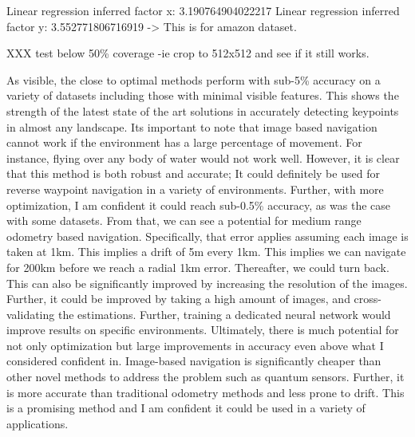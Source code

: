 Linear regression inferred factor x: 3.190764904022217
Linear regression inferred factor y: 3.552771806716919 -> This is for amazon dataset.


XXX test below 50\% coverage -ie crop to 512x512 and see if it still works.


As visible, the close to optimal methods perform with sub-5\% accuracy on a variety of datasets including those with minimal visible features. This shows the strength of the latest state of the art solutions in accurately detecting keypoints in almost any landscape. Its important to note that image based navigation cannot work if the environment has a large percentage of movement. For instance, flying over any body of water would not work well. However, it is clear that this method is both robust and accurate; It could definitely be used for reverse waypoint navigation in a variety of environments. Further, with more optimization, I am confident it could reach sub-0.5\% accuracy, as was the case with some datasets. From that, we can see a potential for medium range odometry based navigation. Specifically, that error applies assuming each image is taken at 1km. This implies a drift of 5m every 1km. This implies we can navigate for 200km before we reach a radial 1km error. Thereafter, we could turn back. This can also be significantly improved by increasing the resolution of the images. Further, it could be improved by taking a high amount of images, and cross-validating the estimations. Further, training a dedicated neural network would improve results on specific environments. Ultimately, there is much potential for not only optimization but large improvements in accuracy even above what I considered confident in. Image-based navigation is significantly cheaper than other novel methods to address the problem such as quantum sensors. Further, it is more accurate than traditional odometry methods and less prone to drift. This is a promising method and I am confident it could be used in a variety of applications.